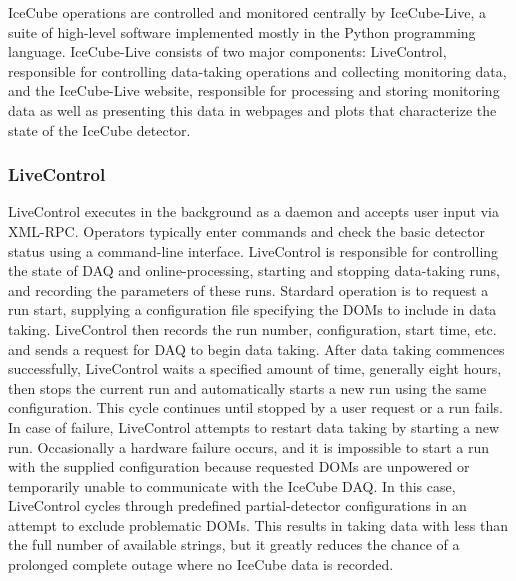IceCube operations are controlled and monitored centrally by
IceCube-Live, a suite of high-level software implemented mostly in the
Python programming language.
IceCube-Live consists of two major components: LiveControl, responsible for controlling data-taking operations and
collecting monitoring data, and the IceCube-Live website, responsible for processing and storing monitoring data as well as presenting this data
in webpages and plots that characterize the state of the IceCube detector.

\subsubsection{LiveControl}

LiveControl executes in the background as a daemon and accepts user input via XML-RPC.
Operators typically enter commands and check the basic detector status using a command-line interface.  LiveControl is
responsible for controlling the state of DAQ and online-processing, starting and stopping data-taking runs, and recording
the parameters of these runs.  Stardard operation is to request a run start, supplying a configuration file specifying the DOMs to include in
data taking.  LiveControl then records the run number, configuration, start time, etc. and sends a request for DAQ to
begin data taking.  After data taking commences successfully, LiveControl waits a specified amount of time, generally eight
hours, then stops the current run and automatically starts a new run using the same configuration.  This cycle continues until
stopped by a user request or a run fails.  In case of failure, LiveControl attempts to restart data taking by starting a new
run.  Occasionally a hardware failure occurs, and it is impossible to start a run with the supplied configuration because requested DOMs are
unpowered or temporarily unable to communicate with the IceCube DAQ.  In this case, LiveControl cycles through predefined partial-detector
configurations in an attempt to exclude problematic DOMs.  This
results in taking data with less than the full number of available strings, but it
greatly reduces the chance of a prolonged complete outage where no IceCube data is recorded.

